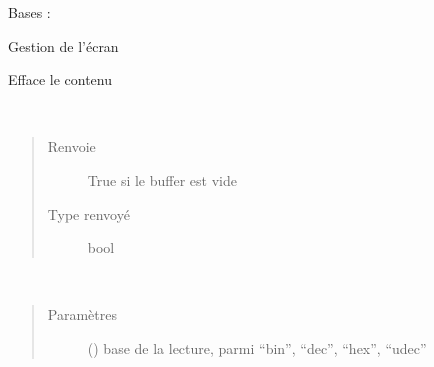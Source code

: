\documentclass[letterpaper,10pt,french]{sphinxmanual}
\begin{document}
\begin{fulllineitems}
\label{\detokenize{executeurcomponents:executeurcomponents.ScreenComponent}}
Bases : {\hyperref[\detokenize{executeurcomponents:executeurcomponents.BaseComponent}]{}}

Gestion de l’écran

\begin{fulllineitems}
\label{\detokenize{executeurcomponents:executeurcomponents.ScreenComponent.clear}}
Efface le contenu

\end{fulllineitems}


\begin{fulllineitems}
\label{\detokenize{executeurcomponents:executeurcomponents.ScreenComponent.empty}}~\begin{quote}\begin{description}
\item[{Renvoie}] \leavevmode
True si le buffer est vide

\item[{Type renvoyé}] \leavevmode
bool

\end{description}\end{quote}

\end{fulllineitems}


\begin{fulllineitems}
\label{\detokenize{executeurcomponents:executeurcomponents.ScreenComponent.getStringList}}~\begin{quote}\begin{description}
\item[{Paramètres}] \leavevmode
{} () \textendash{} base de la lecture, parmi “bin”, “dec”, “hex”, “udec”


\end{description}
\end{quote}
\end{fulllineitems}
\end{fulllineitems}
\end{document}
